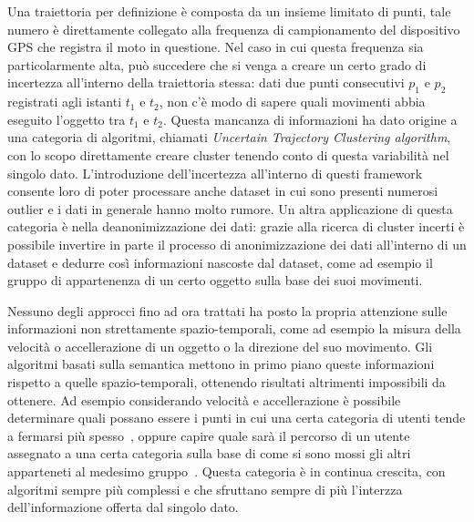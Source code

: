Una traiettoria per definizione è composta da un insieme limitato di punti, tale numero
è direttamente collegato alla frequenza di campionamento del dispositivo GPS che registra
il moto in questione.
Nel caso in cui questa frequenza sia particolarmente alta, può succedere che si venga a creare
un certo grado di incertezza all'interno della traiettoria stessa: dati due punti consecutivi
\(p_{1}\) e \(p_{2}\) registrati agli istanti \(t_{1}\) e \(t_{2}\), non c'è modo di sapere quali
movimenti abbia eseguito l'oggetto tra  \(t_{1}\) e \(t_{2}\).
Questa mancanza di informazioni ha dato origine a una categoria di algoritmi,
chiamati \textit{Uncertain Trajectory Clustering algorithm}, con lo scopo direttamente
creare cluster tenendo conto di questa variabilità nel singolo dato.
L'introduzione dell'incertezza all'interno di questi framework consente loro di poter
processare anche dataset in cui sono presenti numerosi outlier e i dati in generale
hanno molto rumore.
Un altra applicazione di questa categoria è nella deanonimizzazione dei dati: grazie
alla ricerca di cluster incerti è possibile invertire in parte il processo di anonimizzazione
dei dati all'interno di un dataset e dedurre così informazioni nascoste dal dataset, come
ad esempio il gruppo di appartenenza di un certo oggetto sulla base dei suoi movimenti.

Nessuno degli approcci fino ad ora trattati ha posto la propria attenzione sulle informazioni non
strettamente spazio-temporali, come ad esempio la misura della velocità o accellerazione di un oggetto
o la direzione del suo movimento.
Gli algoritmi basati sulla semantica mettono in primo piano queste informazioni rispetto a quelle
spazio-temporali, ottenendo risultati altrimenti impossibili da ottenere.
Ad esempio considerando velocità e accellerazione è possibile determinare quali possano
essere i punti in cui una certa categoria di utenti tende a fermarsi più spesso~\cite{zheng2008understanding},
oppure capire quale sarà il percorso di un utente assegnato a una certa categoria sulla base
di come si sono mossi gli altri apparteneti al medesimo gruppo~\cite{ying2011semantic}.
Questa categoria è in continua crescita, con algoritmi sempre più complessi e che sfruttano sempre di
più l'interzza dell'informazione offerta dal singolo dato.







